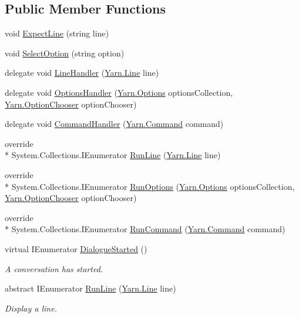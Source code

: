 \subsection*{Public Member Functions}
\begin{DoxyCompactItemize}
\item 
void \hyperlink{a00173_af51a4e0d00f92dcc991f6c1ac62ac8c3}{Expect\-Line} (string line)
\item 
void \hyperlink{a00173_adc743ade599769e968fecea525add7b3}{Select\-Option} (string option)
\item 
delegate void \hyperlink{a00173_ac6c30953edbd1cd4181e2a3854a1642b}{Line\-Handler} (\hyperlink{a00053_a00380}{Yarn.\-Line} line)
\item 
delegate void \hyperlink{a00173_a7fe2e6bc2d5471d9af14a9d35de821bd}{Options\-Handler} (\hyperlink{a00053_a00383}{Yarn.\-Options} options\-Collection, \hyperlink{a00053_a39866cbb03c03a35805d598b5d4ad553}{Yarn.\-Option\-Chooser} option\-Chooser)
\item 
delegate void \hyperlink{a00173_afc93c5cf370b31eceab3671c9eca0d94}{Command\-Handler} (\hyperlink{a00053_a00376}{Yarn.\-Command} command)
\item 
override \\*
System.\-Collections.\-I\-Enumerator \hyperlink{a00173_ae274e39b640908d04aacc6cf6624d9da}{Run\-Line} (\hyperlink{a00053_a00380}{Yarn.\-Line} line)
\item 
override \\*
System.\-Collections.\-I\-Enumerator \hyperlink{a00173_ad2ac83f91814d8666482bf8b6f3721d1}{Run\-Options} (\hyperlink{a00053_a00383}{Yarn.\-Options} options\-Collection, \hyperlink{a00053_a39866cbb03c03a35805d598b5d4ad553}{Yarn.\-Option\-Chooser} option\-Chooser)
\item 
override \\*
System.\-Collections.\-I\-Enumerator \hyperlink{a00173_a01e67009071f9ee5ac5ef3c970cd3695}{Run\-Command} (\hyperlink{a00053_a00376}{Yarn.\-Command} command)
\item 
virtual I\-Enumerator \hyperlink{a00097_af9d88ca81ac536d43046ca6572e3ff54}{Dialogue\-Started} ()
\begin{DoxyCompactList}\small\item\em A conversation has started. \end{DoxyCompactList}\item 
abstract I\-Enumerator \hyperlink{a00097_a754c6dd0bc67895d11f878fe4477d698}{Run\-Line} (\hyperlink{a00053_a00380}{Yarn.\-Line} line)
\begin{DoxyCompactList}\small\item\em Display a line. \end{DoxyCompactList}\item 

\end{DoxyCompactItemize}
